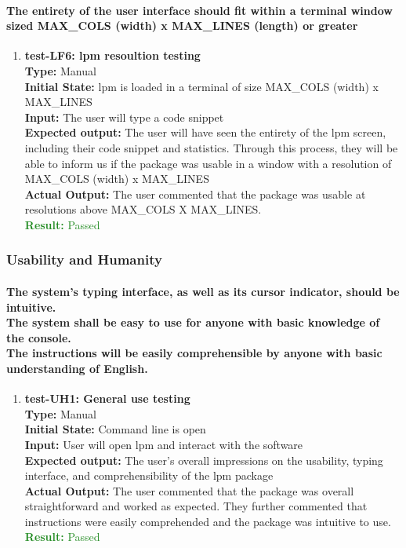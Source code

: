 \documentclass[12pt, titlepage]{article}
\begin{document}
\paragraph{The entirety of the user interface should fit within a terminal window sized MAX\_COLS (width) x MAX\_LINES (length) or greater}
\begin{enumerate}
    \item{\textbf{test-LF6: lpm resoultion testing}\\}
    \textbf{Type:} Manual\\
    \textbf{Initial State:}  lpm is loaded in a terminal of size MAX\_COLS (width) x MAX\_LINES \\
    \textbf{Input:} The user will type a code snippet\\
    \textbf{Expected output: }  The user will have seen the entirety of the lpm screen, including their code snippet and statistics. Through this process, they will be able to inform us if the package was usable in a window with a resolution of MAX\_COLS (width) x MAX\_LINES \\
    \textbf{Actual Output:} The user commented that the package was usable at resolutions above MAX\_COLS X MAX\_LINES. \\
    \textcolor{ForestGreen}{\textbf{Result:} Passed}
\end{enumerate}

\subsubsection{Usability and Humanity}
\paragraph{The system’s typing interface, as well as its cursor indicator, should be intuitive.\\
The system shall be easy to use for anyone with basic knowledge of the console.\\
The instructions will be easily comprehensible by anyone with basic understanding of English.\\}
\begin{enumerate}
\item{\textbf{test-UH1: General use testing}\\}
    \textbf{Type:} Manual\\
    \textbf{Initial State:}  Command line is open\\
    \textbf{Input:} User will open lpm and interact with the software\\
    \textbf{Expected output: }  The user's overall impressions on the usability, typing interface, and comprehensibility of the lpm package \\
    \textbf{Actual Output:} The user commented that the package was overall straightforward and worked as expected. They further commented that instructions were easily comprehended and the package was intuitive to use. \\
    \textcolor{ForestGreen}{\textbf{Result:} Passed}
\end{enumerate}
\end{document}
